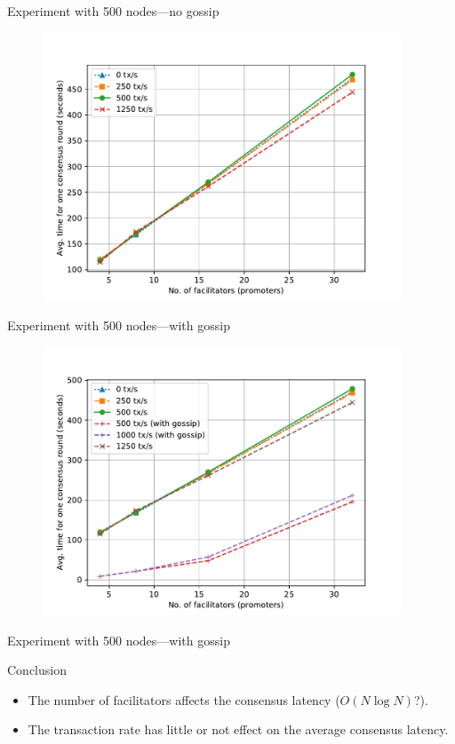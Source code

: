 \documentclass{beamer}
\begin{document}
\begin{frame}{Experiment with 500 nodes---no gossip}
  \begin{figure}[h]
  \includegraphics[width=0.95\textwidth]{consensus-500-no-gossip}
  \centering
  \end{figure}
\end{frame}

\begin{frame}{Experiment with 500 nodes---with gossip}
  \begin{figure}[h]
  \includegraphics[width=0.95\textwidth]{consensus-500}
  \centering
  \end{figure}
\end{frame}

\begin{frame}{Experiment with 500 nodes---with gossip}
  \begin{block}{Conclusion}
    \begin{itemize}
      \item The number of facilitators affects the consensus latency ($O(N\log{N})$?).
      \item The transaction rate has little or not effect on the average consensus latency.
    \end{itemize}
  \end{block}
\end{frame}
\end{document}
